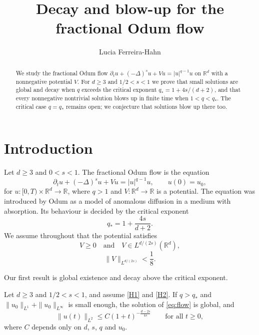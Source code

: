 \documentclass[11pt]{article}
\title{Decay and blow-up for the fractional Odum flow}
\author{Lucia Ferreira-Hahn}
\date{}
\numberwithin{equation}{section}
\newcommand{\R}{\mathbb{R}}
\newcommand{\qc}{q_{*}}
\begin{document}
\maketitle

\begin{abstract}
We study the fractional Odum flow $\partial_t u + (-\Delta)^s u + V u = |u|^{q-1} u$ on $\R^d$ with a nonnegative potential $V$. For $d \geq 3$ and $1/2 < s < 1$ we prove that small solutions are global and decay when $q$ exceeds the critical exponent $\qc = 1 + 4s/(d+2)$, and that every nonnegative nontrivial solution blows up in finite time when $1 < q < \qc$. The critical case $q = \qc$ remains open; we conjecture that solutions blow up there too.
\end{abstract}

\section{Introduction}\label{sec:intro}

Let $d \geq 3$ and $0 < s < 1$. The fractional Odum flow is the equation
\begin{equation}\label{eq:flow}
\partial_t u + (-\Delta)^s u + V u = |u|^{q-1} u, \qquad u(0) = u_0,
\end{equation}
for $u \colon [0, T) \times \R^d \to \R$, where $q > 1$ and $V \colon \R^d \to \R$ is a potential. The equation was introduced by Odum as a model of anomalous diffusion in a medium with absorption. Its behaviour is decided by the critical exponent
\begin{equation}\label{eq:critical}
\qc = 1 + \frac{4s}{d+2}.
\end{equation}
We assume throughout that the potential satisfies
\begin{equation}\tag{H1}\label{H1}
V \geq 0 \quad \text{and} \quad V \in L^{d/(2s)}(\R^d),
\end{equation}
\begin{equation}\tag{H2}\label{H2}
\|V\|_{L^{d/(2s)}} < \frac{1}{8}.
\end{equation}

Our first result is global existence and decay above the critical exponent.

\begin{main}\label{thm:A}
Let $d \geq 3$ and $1/2 < s < 1$, and assume \eqref{H1} and \eqref{H2}. If $q > \qc$ and $\|u_0\|_{L^1} + \|u_0\|_{L^\infty}$ is small enough, the solution of \eqref{eq:flow} is global, and
\begin{equation}\label{eq:decay}
\|u(t)\|_{L^2} \leq C (1 + t)^{-\frac{d-2s}{4s}} \qquad \text{for all } t \geq 0,
\end{equation}
where $C$ depends only on $d$, $s$, $q$ and $u_0$.
\end{main}
\end{document}
